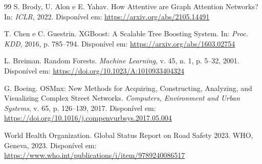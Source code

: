 \documentclass[12pt]{article}
\begin{document}
\begin{thebibliography}{99}
S. Brody, U. Alon e E. Yahav.
\newblock How Attentive are Graph Attention Networks?
\newblock In: \textit{ICLR}, 2022.
\newblock Disponível em: \url{https://arxiv.org/abs/2105.14491}

T. Chen e C. Guestrin.
\newblock XGBoost: A Scalable Tree Boosting System.
\newblock In: \textit{Proc. KDD}, 2016, p. 785--794.
\newblock Disponível em: \url{https://arxiv.org/abs/1603.02754}

L. Breiman.
\newblock Random Forests.
\newblock \textit{Machine Learning}, v. 45, n. 1, p. 5--32, 2001.
\newblock Disponível em: \url{https://doi.org/10.1023/A:1010933404324}

G. Boeing.
\newblock OSMnx: New Methods for Acquiring, Constructing, Analyzing,
and Visualizing Complex Street Networks.
\newblock \textit{Computers, Environment and Urban Systems}, v. 65,
p. 126--139, 2017.
\newblock Disponível em: \url{https://doi.org/10.1016/j.compenvurbsys.2017.05.004}

World Health Organization.
\newblock Global Status Report on Road Safety 2023.
\newblock WHO, Geneva, 2023.
\newblock Disponível em: \url{https://www.who.int/publications/i/item/9789240086517}

\end{thebibliography}
\end{document}
